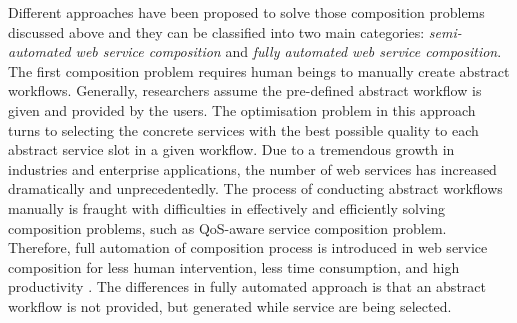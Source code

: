 Different approaches \cite{da2016genetic,da2016particle,gupta2015optimization,lecue2009optimizing,ma2015hybrid,qi2010combining,rodriguez2010composition,yu2013adaptive,wang2014automated} have been proposed to solve those composition problems discussed above and they can be classified into two main categories: \emph{semi-automated web service composition} and \emph{fully automated web service composition}. The first composition problem requires human beings to manually create abstract workflows. Generally, researchers assume the pre-defined abstract workflow is given and provided by the users. The optimisation problem in this approach turns to selecting the concrete services with the best possible quality to each abstract service slot in a given workflow. Due to a tremendous growth in industries and enterprise applications, the number of web services has increased dramatically and unprecedentedly. The process of conducting abstract workflows  manually is fraught with difficulties in effectively and efficiently solving composition problems, such as QoS-aware service composition problem. Therefore, full automation of composition process is introduced in web service composition for less human intervention, less time consumption, and high productivity \cite{rao2004survey}. The differences in fully automated approach is that an abstract workflow is not provided, but generated while service are being selected. 


